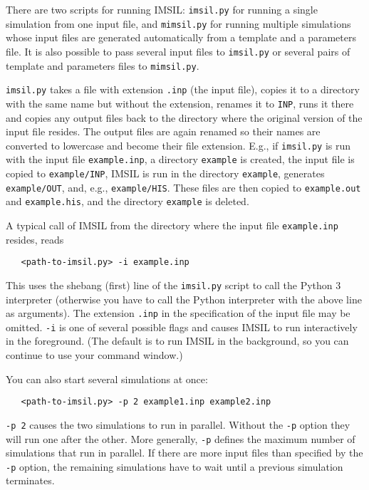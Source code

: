There are two scripts for running IMSIL: \texttt{imsil.py} for running a
single simulation from one input file, and \texttt{mimsil.py} for running
multiple simulations whose input files are generated automatically from a
template and a parameters file. It is also possible to pass several input files
to \texttt{imsil.py} or several pairs of template and parameters files to
\texttt{mimsil.py}.

\texttt{imsil.py} takes a file with extension \texttt{.inp} (the input file),
copies it to a directory with the same name but without the extension,
renames it to \texttt{INP}, runs it there and copies any output files back to
the directory where the original version of the input file resides. The output
files are again renamed so their names are converted to lowercase and become
their file extension. E.g., if \texttt{imsil.py} is run with the input file
\texttt{example.inp}, a directory \texttt{example} is created, the input file is
copied to \texttt{example/INP}, IMSIL is run in the directory \texttt{example},
generates \texttt{example/OUT}, and, e.g., \texttt{example/HIS}. These files are
then copied to \texttt{example.out} and \texttt{example.his}, and the directory
\texttt{example} is deleted.

A typical call of IMSIL from the directory where the input file
\texttt{example.inp} resides, reads
%
\begin{verbatim}
   <path-to-imsil.py> -i example.inp
\end{verbatim}
%
This uses the shebang (first) line of the \texttt{imsil.py} script to call the
Python 3 interpreter (otherwise you have to call the Python interpreter with
the above line as arguments). The extension \texttt{.inp} in the specification
of the input file may be omitted. \texttt{-i} is one of several possible flags
and causes IMSIL to run interactively in the foreground. (The default is to run
IMSIL in the background, so you can continue to use your command window.)

You can also start several simulations at once:
%
\begin{verbatim}
   <path-to-imsil.py> -p 2 example1.inp example2.inp
\end{verbatim}
%
\texttt{-p 2} causes the two simulations to run in parallel. Without the
\texttt{-p} option they will run one after the other. More generally,
\texttt{-p} defines the maximum number of simulations that run in parallel. If
there are more input files than specified by the \texttt{-p} option, the
remaining simulations have to wait until a previous simulation terminates.


